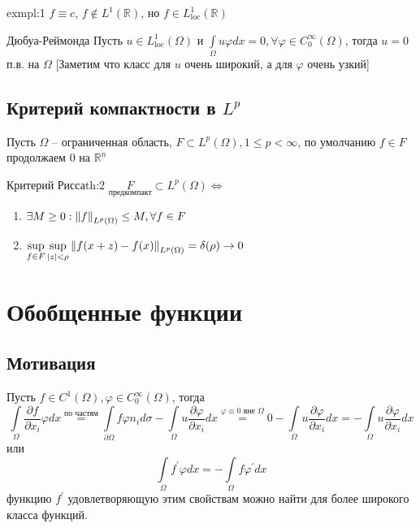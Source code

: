 \documentclass[12pt,a4paper]{article}
\newcommand{\intset}[1]{\int\limits_{#1}}
\newcommand{\Real}{\mathbb{R}}
\begin{document}
\begin{example}{}{exmpl:1}
	$f \equiv c$, $f \notin L^1 (\Real)$, но $f \in L^1_{\text{loc}} (\Real)$
\end{example}
	
\begin{lemma}{Дюбуа-Реймонда}{}
	Пусть $u \in L^1_{\text{loc}} (\Omega)$ и $\intset{\Omega}{u\varphi dx} = 0, \forall \varphi \in C^{\infty}_0 (\Omega)$, тогда $u = 0$ п.в. на $\Omega$ [Заметим что класс для $u$ очень широкий, а для $\varphi$ очень узкий]
\end{lemma}

\subsection{Критерий компактности в $L^p$}

Пусть $\Omega$ -- ограниченная область, $F \subset L^p (\Omega), 1 \leq p < \infty$, по умолчанию $f \in F$ продолжаем 0 на $\Real^n$
\begin{theorem}{Критерий Рисса}{th:2}
	$\underset{\text{предкомпакт}}{F} \subset L^p (\Omega) \Leftrightarrow$
	\begin{enumerate}
		\item $\exists M \geq 0: \norm{f}_{L^p (\Omega)} \leq M, \forall f \in F$
		\item $\sup\limits_{f\in F}{\sup\limits_{|z| < \rho}{\norm{f(x+z) - f(x)}_{L^p (\Omega)}}} = \delta(\rho) \to 0$
	\end{enumerate}
\end{theorem}

\section{Обобщенные функции}

\subsection{Мотивация}

Пусть $f \in C^1 (\Omega), \varphi \in C_0^\infty (\Omega)$, тогда
\begin{equation*}
	\intset{\Omega}{\frac{\partial f}{\partial x_i} \varphi dx} \overset{\text{по частям}}{=} \intset{\partial \Omega}{f \varphi n_i d\sigma} - \intset{\Omega}{u \frac{\partial \varphi}{\partial x_i} dx} \overset{\varphi \equiv 0 \text{ вне } \Omega}{=} 0 - \intset{\Omega}{u \frac{\partial \varphi}{\partial x_i} dx} = -\intset{\Omega}{u \frac{\partial \varphi}{\partial x_i} dx}
\end{equation*}
или
\begin{equation*}
	\intset{\Omega}{f^\prime \varphi dx} = -\intset{\Omega}{f \varphi^\prime dx}
\end{equation*}
функцию $f^\prime$ удовлетворяющую этим свойствам можно найти для более широкого класса функций.
\end{document}
